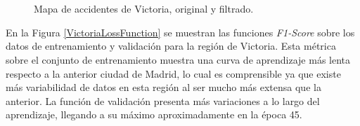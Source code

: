 \begin{figure}[H]
	\centering
	\\
	\\
	\caption{Mapa de accidentes de Victoria, original y filtrado.}
	\label{VictoriaAccidentsMap}
\end{figure}


En la Figura \ref{VictoriaLossFunction} se muestran las funciones \textit{F1-Score} sobre los datos de entrenamiento y validación para la región de Victoria. Esta métrica sobre el conjunto de entrenamiento muestra una curva de aprendizaje más lenta respecto a la anterior ciudad de Madrid, lo cual es comprensible ya que existe más variabilidad de datos en esta región al ser mucho más extensa que la anterior. La función de validación presenta más variaciones a lo largo del aprendizaje, llegando a su máximo aproximadamente en la época 45.

